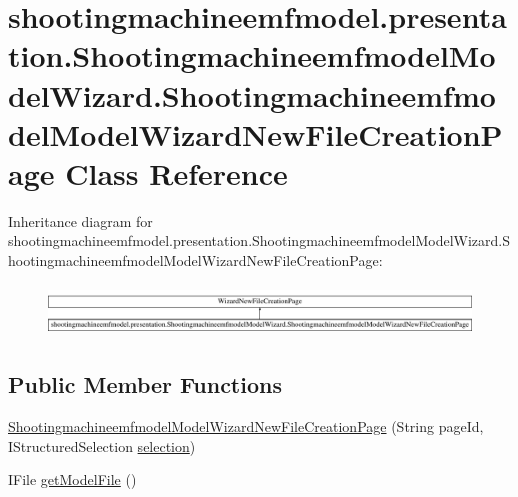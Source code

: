 \hypertarget{classshootingmachineemfmodel_1_1presentation_1_1_shootingmachineemfmodel_model_wizard_1_1_shooti0374ed52aef5c158aa4d43d4797c2d9f}{\section{shootingmachineemfmodel.\-presentation.\-Shootingmachineemfmodel\-Model\-Wizard.\-Shootingmachineemfmodel\-Model\-Wizard\-New\-File\-Creation\-Page Class Reference}
\label{classshootingmachineemfmodel_1_1presentation_1_1_shootingmachineemfmodel_model_wizard_1_1_shooti0374ed52aef5c158aa4d43d4797c2d9f}
}
Inheritance diagram for shootingmachineemfmodel.\-presentation.\-Shootingmachineemfmodel\-Model\-Wizard.\-Shootingmachineemfmodel\-Model\-Wizard\-New\-File\-Creation\-Page\-:\begin{figure}[H]
\begin{center}
\leavevmode
\includegraphics[height=1.370869cm]{classshootingmachineemfmodel_1_1presentation_1_1_shootingmachineemfmodel_model_wizard_1_1_shooti0374ed52aef5c158aa4d43d4797c2d9f}
\end{center}
\end{figure}
\subsection*{Public Member Functions}
\begin{DoxyCompactItemize}
\item 
\hyperlink{classshootingmachineemfmodel_1_1presentation_1_1_shootingmachineemfmodel_model_wizard_1_1_shooti0374ed52aef5c158aa4d43d4797c2d9f_a859a369b75fe16c808b73886e08a46f2}{Shootingmachineemfmodel\-Model\-Wizard\-New\-File\-Creation\-Page} (String page\-Id, I\-Structured\-Selection \hyperlink{classshootingmachineemfmodel_1_1presentation_1_1_shootingmachineemfmodel_model_wizard_aad927182a7d8d6009308666dfa170cb6}{selection})
\item 
I\-File \hyperlink{classshootingmachineemfmodel_1_1presentation_1_1_shootingmachineemfmodel_model_wizard_1_1_shooti0374ed52aef5c158aa4d43d4797c2d9f_ab7e8d053d233ebc7aa992edf3afd1e75}{get\-Model\-File} ()
\end{DoxyCompactItemize}
